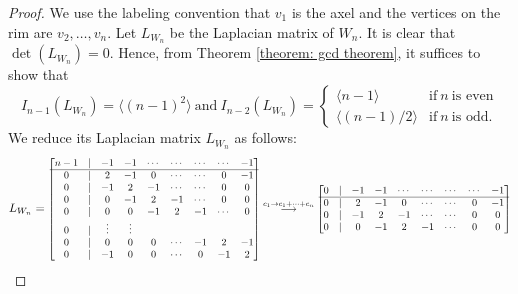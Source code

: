 \documentclass[11pt,reqno]{amsart}
\newcommand\scalemath[2]{\scalebox{#1}{\mbox{\ensuremath{\displaystyle #2}}}}
\theoremstyle{definition}
\theoremstyle{plain}
\begin{document}
\begin{proof}
We use the labeling convention that $v_1$ is the axel and the vertices on the rim are $v_2, \dots, v_{n}$.  
Let $L_{W_n}$ be the Laplacian matrix of $W_n$. It is clear that $\det(L_{W_n})=0$. Hence, from Theorem \ref{theorem: gcd theorem}, it suffices to show that 
\begin{equation*}
I_{n-1}(L_{W_n}) = \langle (n-1)^2 \rangle~\text{and}~ I_{n-2}(L_{W_n}) = \begin{cases}
\langle n-1 \rangle & \text{if}~ n ~\text{is even} \\
\langle (n-1)/2\rangle & \text{if}~ n ~\text{is odd}.
\end{cases}
\end{equation*}
We reduce its Laplacian matrix $L_{W_n}$ as follows:
\[
L_{W_n}=\scalemath{0.85}{\begin{bmatrix}
	n-1 & | & -1 & -1 & \cdots & \cdots & \cdots & \cdots & -1 \\
	\hline
	0 & | & 2 & -1 & 0 & \cdots & \cdots & 0 & -1 \\
	0 & | & - 1& 2 & -1 & \cdots & \cdots & 0 & 0 \\
	0 & | & 0 & - 1& 2 & -1 & \cdots & 0 & 0 \\
	0 & | & 0 & 0 & - 1& 2 & -1 & \cdots & 0 \\
	0 & | & \vdots & \vdots \\
	0 & | & 0 & 0 & 0 & \cdots & -1& 2 & -1 \\
	0 & | & -1 & 0 & 0 & \cdots& 0 & -1 & 2 
\end{bmatrix} 
\stackrel{c_1 \to c_1 + \cdots + c_n}\longrightarrow \begin{bmatrix}
	0 & | & -1 & -1 & \cdots & \cdots & \cdots & \cdots & -1 \\
	\hline
	0 & | & 2 & -1 & 0 & \cdots & \cdots & 0 & -1 \\
	0 & | & - 1& 2 & -1 & \cdots & \cdots & 0 & 0 \\
	0 & | & 0 & - 1& 2 & -1 & \cdots & 0 & 0 \\

\end{bmatrix}}\]
\end{proof}
\end{document}
